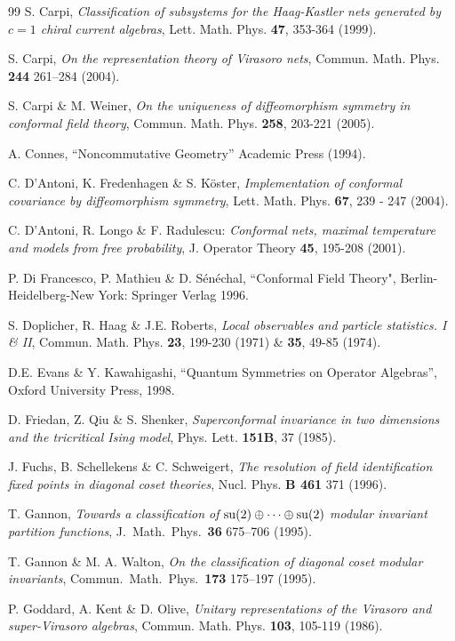 \documentclass[11pt]{article}
\begin{document}
{{\begin{thebibliography}{99}
 S. Carpi, 
{\it Classification of subsystems for the Haag-Kastler nets generated by $c=1$ 
chiral current algebras},  
Lett. Math. Phys.  {\bf 47}, 353-364 (1999).

 S. Carpi, {\it On the representation theory of Virasoro 
nets}, Commun. Math. Phys. {\bf 244} 261--284 (2004). 

 S. Carpi \& M. Weiner, 
{\it On the uniqueness of diffeomorphism symmetry in conformal field theory},  
Commun. Math. Phys.  {\bf 258}, 203-221 (2005).

 A. Connes, 
``Noncommutative Geometry'' Academic Press (1994).

 C. D'Antoni, K. Fredenhagen \& S. K\"oster,
{\it Implementation of conformal covariance by diffeomorphism symmetry}, 
Lett. Math. Phys. {\bf 67},  239 - 247 (2004).

 C. D'Antoni, R. Longo \& F. Radulescu: 
{\it Conformal nets, maximal temperature and models from free probability}, 
J. Operator Theory {\bf 45}, 195-208 (2001).

 P. Di Francesco, P. Mathieu \& D. S\'en\'echal,
``Conformal Field Theory", Berlin-Heidelberg-New York: Springer Verlag 
1996.

   S. Doplicher, R. Haag \& J.E. Roberts, 
{\it Local observables and particle statistics. I \& II}, Commun. Math. Phys. 
{\bf 23},  199-230 (1971) \& {\bf 35}, 49-85 (1974).

 D.E. Evans \& Y. Kawahigashi, 
``Quantum Symmetries on Operator Algebras'', Oxford University Press, 1998.

 D. Friedan, Z. Qiu \& S. Shenker, 
{\it Superconformal invariance in two dimensions and the tricritical 
Ising model}, Phys. Lett. {\bf 151B}, 37 (1985).

 J. Fuchs, B. Schellekens \& C. Schweigert, 
{\it The resolution of field identification fixed points in diagonal coset theories}, 
Nucl. Phys. {\bf B 461} 371 (1996).

 T. Gannon,
{\it Towards a classification of ${\rm su}(2)\oplus\cdots\oplus{\rm su}(2)$
modular invariant partition functions},
J.\ Math.\ Phys.\ {\bf 36} 675--706 (1995).

 T. Gannon \& M. A. Walton,
{\it On the classification of diagonal coset modular invariants},
Commun.\ Math.\ Phys.\ {\bf 173} 175--197 (1995).

 P. Goddard, A. Kent \& D. Olive, 
{\it Unitary representations of the Virasoro and super-Virasoro 
algebras}, Commun. Math. Phys. {\bf 103}, 105-119 (1986).


\end{thebibliography}}}
\end{document}
